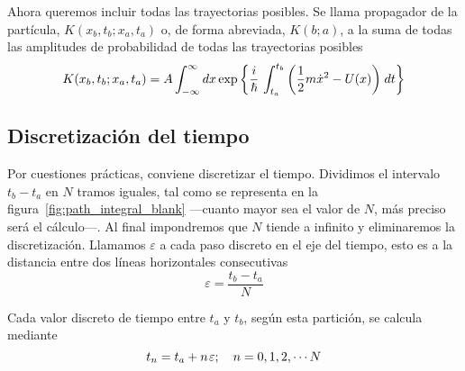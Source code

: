 Ahora queremos incluir todas las trayectorias posibles. Se llama
propagador de la partícula, $K(x_b,t_b;x_a,t_a)$ o, de forma
abreviada, $K(b;a)$, a la suma de todas las amplitudes de probabilidad
de todas las trayectorias posibles
\[
  K(x_b,t_b; x_a,t_a)
  =
  A \int_{-\infty}^{\infty} dx \exp\left\{\frac{i}{\hslash}\,\int_{t_a}^{t_b}\left(\frac{1}{2}m\dot{x}^2-U(x)\right)\kern1pt dt\right\}
\]

\subsection{Discretización del tiempo}
Por cuestiones prácticas, conviene discretizar el tiempo. Dividimos el
intervalo $t_b-t_a$ en $N$ tramos iguales, tal como se representa en
la figura~\ref{fig:path_integral_blank} ---cuanto mayor sea el valor
de $N$, más preciso será el cálculo---. Al final impondremos que $N$
tiende a infinito y eliminaremos la discretización. Llamamos
$\varepsilon$ a cada paso discreto en el eje del tiempo, esto es a la
distancia entre dos líneas horizontales consecutivas
\[
  \varepsilon = \dfrac{t_b-t_a}{N}
\]

Cada valor discreto de tiempo entre $t_a$ y $t_b$, según esta
partición, se calcula mediante
\[
  t_n = t_a + n\kern1pt\varepsilon
  ;\hspace{1em}
  n = 0, 1, 2, \cdots N
\]

